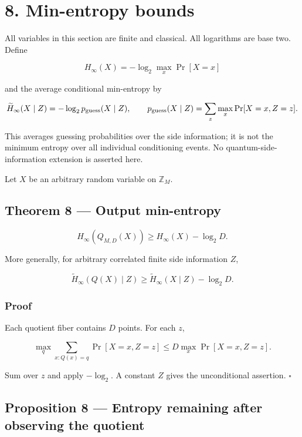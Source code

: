 \documentclass[11pt,a4paper]{article}
\begin{document}
\section{8. Min-entropy bounds}\label{min-entropy-bounds}

All variables in this section are finite and classical. All logarithms are base two. Define

\[
H_\infty(X)=-\log_2\max_x\Pr[X=x]
\]

and the average conditional min-entropy by

\[
\widetilde H_\infty(X\mid Z)
=-\log_2 p_{\rm guess}(X\mid Z),\qquad
p_{\rm guess}(X\mid Z)=\sum_z\max_x\Pr[X=x,Z=z].
\]

This averages guessing probabilities over the side information; it is not the minimum entropy over all individual conditioning events. No quantum-side-information extension is asserted here.

Let \(X\) be an arbitrary random variable on \(\mathbb Z_M\).

\subsection{Theorem 8 --- Output min-entropy}\label{theorem-8-output-min-entropy}

\[
\boxed{H_\infty(Q_{M,D}(X))\ge H_\infty(X)-\log_2D.}
\]

More generally, for arbitrary correlated finite side information \(Z\),

\[
\boxed{\widetilde H_\infty(Q(X)\mid Z)
\ge\widetilde H_\infty(X\mid Z)-\log_2D.}
\]

\subsubsection{Proof}\label{proof-7}

Each quotient fiber contains \(D\) points. For each \(z\),

\[
\max_q\sum_{x:Q(x)=q}\Pr[X=x,Z=z]
\le D\max_x\Pr[X=x,Z=z].
\]

Sum over \(z\) and apply \(-\log_2\). A constant \(Z\) gives the unconditional assertion. \(\square\)

\subsection{Proposition 8 --- Entropy remaining after observing the quotient}\label{proposition-8-entropy-remaining-after-observing-the-quotient}
\end{document}
